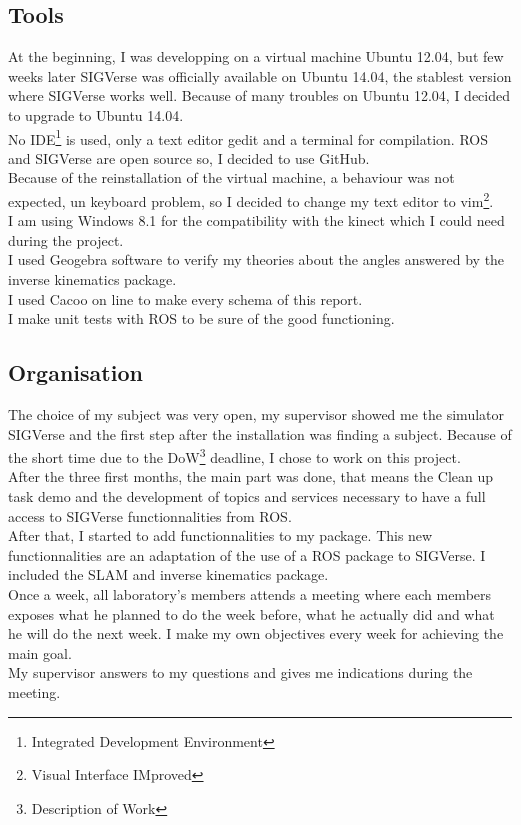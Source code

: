 \subsection{Tools}
At the beginning, I was developping on a virtual machine Ubuntu 12.04, but few weeks later SIGVerse was officially available on Ubuntu 14.04, the stablest version where SIGVerse works well. Because of many troubles on Ubuntu 12.04, I decided to upgrade to Ubuntu 14.04.\\
No IDE\footnote{Integrated Development Environment} is used, only a text editor gedit and a terminal for compilation. ROS and SIGVerse are open source so, I decided to use GitHub.\\
Because of the reinstallation of the virtual machine, a behaviour was not expected, un keyboard problem, so I decided to change my text editor to vim\footnote{Visual Interface IMproved}.\\ 
I am using Windows 8.1 for the compatibility with the kinect which I could need during the project.\\

I used Geogebra software to verify my theories about the angles answered by the inverse kinematics package.\\
I used Cacoo on line to make every schema of this report.\\
I make unit tests with ROS to be sure of the good functioning.

\subsection{Organisation}
The choice of my subject was very open, my supervisor showed me the simulator SIGVerse and the first step after the installation was finding a subject. Because of the short time due to the DoW\footnote{Description of Work} deadline, I chose to work on this project.\\
After the three first months, the main part was done, that means the Clean up task demo and the development of topics and services necessary to have a full access to SIGVerse functionnalities from ROS.\\
After that, I started to add functionnalities to my package. This new functionnalities are an adaptation of the use of a ROS package to SIGVerse. I included the SLAM and inverse kinematics package.\\

Once a week, all laboratory's members attends a meeting where each members exposes what he planned to do the week before, what he actually did and what he will do the next week. I make my own objectives every week for achieving the main goal.\\
My supervisor answers to my questions and gives me indications during the meeting.

